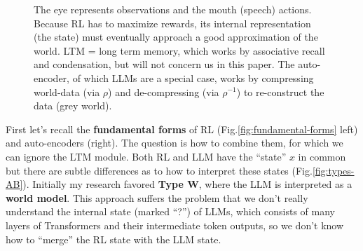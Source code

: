 \documentclass[runningheads]{llncs}
\begin{document}
\begin{figure}
\caption{The eye represents observations and the mouth (speech) actions.  Because RL has to maximize rewards, its internal representation (the state) must eventually approach a good approximation of the world.  LTM = long term memory, which works by associative recall and condensation, but will not concern us in this paper.  The auto-encoder, of which LLMs are a special case, works by compressing world-data (via $\rho$) and de-compressing (via $\rho^{-1}$) to re-construct the data (grey world).}
\end{figure}

First let's recall the \textbf{fundamental forms} of RL (Fig.\ref{fig:fundamental-forms} left) and auto-encoders (right).  The question is how to combine them, for which we can ignore the LTM module. Both RL and LLM have the ``state'' $x$ in common but there are subtle differences as to how to interpret these states (Fig.\ref{fig:types-AB}).  Initially my research favored \textbf{Type W}, where the LLM is interpreted as a \textbf{world model}.  This approach suffers the problem that we don't really understand the internal state (marked ``?'') of LLMs, which consists of many layers of Transformers and their intermediate token outputs, so we don't know how to ``merge'' the RL state with the LLM state.
\end{document}
